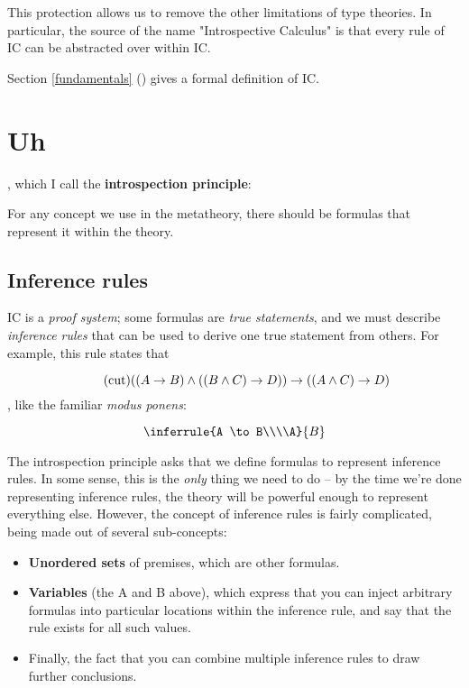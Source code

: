 \documentclass{article}
\begin{document}
  This protection allows us to remove the other limitations of type theories.
  In particular, the source of the name "Introspective Calculus" is that every rule of IC can be abstracted over within IC.



  
  Section \ref{fundamentals} (\textit{}) gives a formal definition of IC. 
   
  \section{Uh}
  
  , which I call the \textbf{introspection principle}:
  
  
  \begin{center}
    For any concept we use in the metatheory, there should be formulas that represent it within the theory.
  \end{center}
  
  \subsection{Inference rules}
  
  IC is a \emph{proof system}; some formulas are \emph{true statements}, and we must describe \emph{inference rules} that can be used to derive one true statement from others. For example, this rule states that
  
  \begin{equation*}
    \tag{cut}
    ((A \to B) \wedge ((B \wedge C) \to D)) \to ((A \wedge C) \to D)\\
  \end{equation*}
  , like the familiar \emph{modus ponens}:
  
  \begin{equation*}
    \inferrule{A \to B\\\\A}{B}
  \end{equation*}
  
  The introspection principle asks that we define formulas to represent inference rules.
  In some sense, this is the \emph{only} thing we need to do – by the time we're done representing inference rules, the theory will be powerful enough to represent everything else.
  However, the concept of inference rules is fairly complicated, being made out of several sub-concepts:
  \begin{itemize}
    \item \textbf{Unordered sets} of premises, which are other formulas.
    \item \textbf{Variables} (the A and B above), which express that you can inject arbitrary formulas into particular locations within the inference rule, and say that the rule exists for all such values.
    \item Finally, the fact that you can combine multiple inference rules to draw further conclusions.
  \end{itemize}
  
\end{document}

